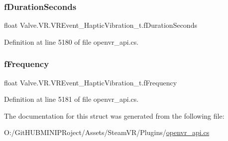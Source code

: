 \subsubsection{\texorpdfstring{fDurationSeconds}{fDurationSeconds}}
{\footnotesize\ttfamily float Valve.\+V\+R.\+V\+R\+Event\+\_\+\+Haptic\+Vibration\+\_\+t.\+f\+Duration\+Seconds}



Definition at line 5180 of file openvr\+\_\+api.\+cs.

\mbox{\label{struct_valve_1_1_v_r_1_1_v_r_event___haptic_vibration__t_a181136abf12c1ce7a9179b12abc1974d}} 
\subsubsection{\texorpdfstring{fFrequency}{fFrequency}}
{\footnotesize\ttfamily float Valve.\+V\+R.\+V\+R\+Event\+\_\+\+Haptic\+Vibration\+\_\+t.\+f\+Frequency}



Definition at line 5181 of file openvr\+\_\+api.\+cs.



The documentation for this struct was generated from the following file\+:\begin{DoxyCompactItemize}
\item 
O\+:/\+Git\+H\+U\+B\+M\+I\+N\+I\+P\+Roject/\+Assets/\+Steam\+V\+R/\+Plugins/\mbox{\hyperlink{openvr__api_8cs}{openvr\+\_\+api.\+cs}}\end{DoxyCompactItemize}
